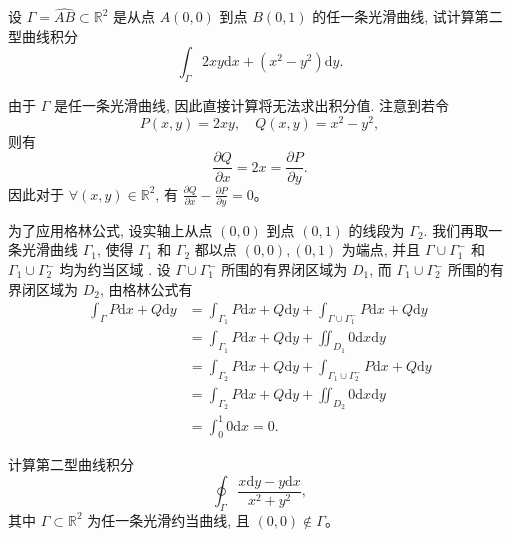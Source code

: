 \documentclass[UTF8,12pt,a4paper,fontset=fandol]{ctexart}
\begin{document}
\begin{example}\label{course-example-16-5-1}\quad 设 $\Gamma=\widehat{AB}\subset\mathbb R^2$ 是从点 $A(0,0)$ 到点 $B(0,1)$ 的任一条光滑曲线, 试计算第二型曲线积分
\[
  \int_\Gamma 2xy\mathrm dx+(x^2-y^2)\mathrm dy.
\]

\end{example}
\begin{solve}\quad 由于 $\Gamma$ 是任一条光滑曲线, 因此直接计算将无法求出积分值. 注意到若令
\[
  P(x,y)=2xy,\quad Q(x,y)=x^2-y^2,
\]
则有
\[
  \frac{\partial Q}{\partial x}=2x=\frac{\partial P}{\partial y}.
\]
因此对于 $\forall(x,y)\in\mathbb R^2$, 有 $\frac{\partial Q}{\partial x}-\frac{\partial P}{\partial y}=0$。

为了应用格林公式, 设实轴上从点 $(0,0)$ 到点 $(0,1)$ 的线段为 $\Gamma_2$. 我们再取一条光滑曲线 $\Gamma_1$, 使得 $\Gamma_1$ 和 $\Gamma_2$ 都以点 $(0,0),(0,1)$ 为端点, 并且 $\Gamma\cup\Gamma_1^-$ 和 $\Gamma_1\cup\Gamma_2^-$ 均为约当区域 . 设 $\Gamma\cup\Gamma_1^-$ 所围的有界闭区域为 $D_1$, 而 $\Gamma_1\cup\Gamma_2^-$ 所围的有界闭区域为 $D_2$, 由格林公式有
\[
\begin{aligned}
  \int_\Gamma P\mathrm dx+Q\mathrm dy
  &=\int_{\Gamma_1}P\mathrm dx+Q\mathrm dy+\int_{\Gamma\cup\Gamma_1^-}P\mathrm dx+Q\mathrm dy\\
  &=\int_{\Gamma_1}P\mathrm dx+Q\mathrm dy+\iint_{D_1}0\mathrm dx\mathrm dy\\
  &=\int_{\Gamma_2}P\mathrm dx+Q\mathrm dy+\int_{\Gamma_1\cup\Gamma_2^-}P\mathrm dx+Q\mathrm dy\\
  &=\int_{\Gamma_2}P\mathrm dx+Q\mathrm dy+\iint_{D_2}0\mathrm dx\mathrm dy\\
  &=\int_0^1 0\mathrm dx=0.
\end{aligned}
\]

\end{solve}
\begin{example}\label{course-example-16-5-2}\quad 计算第二型曲线积分
\[
  \oint_\Gamma\frac{x\mathrm dy-y\mathrm dx}{x^2+y^2},
\]
其中 $\Gamma\subset\mathbb R^2$ 为任一条光滑约当曲线, 且 $(0,0)\notin\Gamma$。

\end{example}
\end{document}
